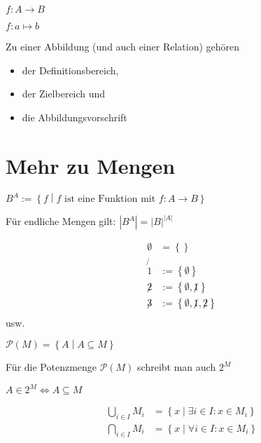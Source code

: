 \begin{notation}
  $f: A \to B$
\end{notation}
\begin{notation}
  $f: a \mapsto b$
\end{notation}
\begin{remark}
  Zu einer Abbildung (und auch einer Relation) gehören
  \begin{itemize}
  \item der Definitionsbereich,
  \item der Zielbereich und
  \item die Abbildungsvorschrift
  \end{itemize}
\end{remark}

\section{Mehr zu Mengen}

\begin{notation}
  $B^A := \left\{ f \middle| f \text{ ist eine Funktion mit } f: A \to B \right\}$
\end{notation}
\begin{remark}
  Für endliche Mengen gilt: $|B^A| = |B|^{|A|}$
\end{remark}

\begin{remark}
  \begin{align*}
    \emptyset &= \left\{  \right\} \\
    \not{1} &:= \left\{ \emptyset \right\} \\
    \not2 &:= \left\{ \emptyset, \not1 \right\} \\
    \not3 &:= \left\{ \emptyset, \not1, \not2 \right\} \\
  \end{align*}
  usw.
\end{remark}

\begin{definition}[Potenzmenge]
  $\mathscr{P}(M) = \left\{ A \middle| A \subseteq M \right\}$
\end{definition}
\begin{notation}
  Für die Potenzmenge $\mathscr{P}(M)$ schreibt man auch $2^M$
\end{notation}
\begin{remark}
  $A \in 2^M \iff A \subseteq M$
\end{remark}
\begin{notation}
  \begin{align*}
    \bigcup_{i \in I} M_i &= \left\{ x \middle| \exists i \in I: x \in M_i \right\} \\
    \bigcap_{i \in I} M_i &= \left\{ x \middle| \forall i \in I: x \in M_i \right\}
  \end{align*}
\end{notation}